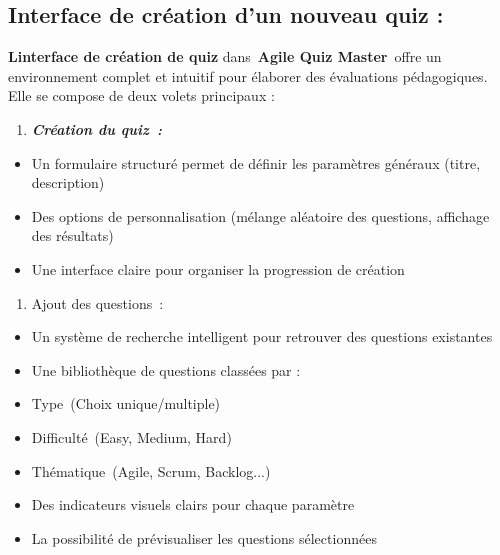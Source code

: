 \documentclass[12pt,a4paper,twoside,openright]{report}
\begin{document}
\hypertarget{interface-de-cruxe9ation-dun-nouveau-quiz}{%
\subsection{Interface de création d'un nouveau quiz
:}\label{interface-de-cruxe9ation-dun-nouveau-quiz}}

\textbf{L\textquotesingle interface de création de quiz}
dans~\textbf{Agile Quiz Master}~offre un environnement complet et
intuitif pour élaborer des évaluations pédagogiques. Elle se compose de
deux volets principaux :

\begin{enumerate}
\def\labelenumi{\arabic{enumi}.}
\item
  \emph{\textbf{Création du quiz~:}}
\end{enumerate}

\begin{itemize}
\item
  Un formulaire structuré permet de définir les paramètres généraux
  (titre, description)
\item
  Des options de personnalisation (mélange aléatoire des questions,
  affichage des résultats)
\item
  Une interface claire pour organiser la progression de création
\end{itemize}

\begin{enumerate}
\def\labelenumi{\arabic{enumi}.}
\setcounter{enumi}{1}
\item
  Ajout des questions~:
\end{enumerate}

\begin{itemize}
\item
  Un système de recherche intelligent pour retrouver des questions
  existantes
\item
  Une bibliothèque de questions classées par :
\end{itemize}

\begin{itemize}
\item
  Type~(Choix unique/multiple)
\item
  Difficulté~(Easy, Medium, Hard)
\item
  Thématique~(Agile, Scrum, Backlog...)
\end{itemize}

\begin{itemize}
\item
  Des indicateurs visuels clairs pour chaque paramètre
\item
  La possibilité de prévisualiser les questions sélectionnées
\end{itemize}
\end{document}

